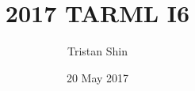 \documentclass[a4paper, 12pt]{article}
\title{2017 TARML I6}
\author{Tristan Shin}
\date{20 May 2017}
\begin{document}
\maketitle



\hrulefill

\begin{solution}

\end{solution}
\end{document}
